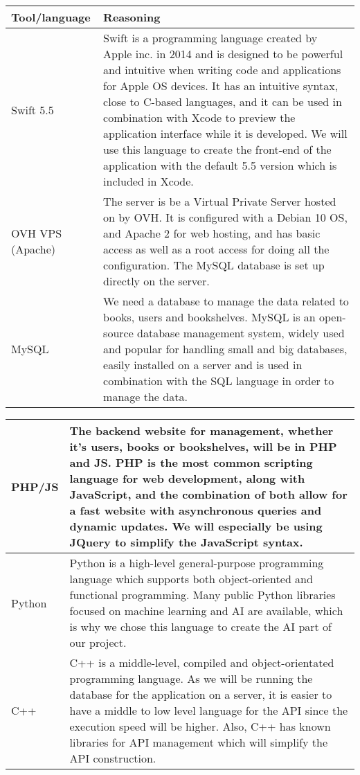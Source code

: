 \documentclass[conference]{IEEEtran}
\begin{document}
\begin{center}
\begin{tabular}{ | m{1.9cm} | m{5.7cm}| } 

\hline
Tool/language & Reasoning \\
 \hline
 Swift 5.5 &  Swift is a programming language created by Apple inc. in 2014 and is designed to be powerful and intuitive when writing code and applications for Apple OS devices. It has an intuitive syntax, close to C-based languages, and it can be used in combination with Xcode to preview the application interface while it is developed. We will use this language to create the front-end of the application with the default 5.5 version which is included in Xcode.\\
  \hline
 OVH VPS (Apache) &  The server is be a Virtual Private Server hosted on by OVH. It is configured with a Debian 10 OS, and Apache 2 for web hosting, and has basic access as well as a root access for doing all the configuration. The MySQL database is set up directly on the server.\\ 
 \hline
 MySQL & We need a database to manage the data related to books, users and bookshelves. MySQL is an open-source database management system, widely used and popular for handling small and big databases, easily installed on a server and is used in combination with the SQL language in order to manage the data.\\
 \hline
 \end{tabular}
 
 \begin{tabular}{ | m{1.9cm} | m{5.7cm}| } 
 \hline
 PHP/JS & The backend website for management, whether it's users, books or bookshelves, will be in PHP and JS. PHP is the most common scripting language for web development, along with JavaScript, and the combination of both allow for a fast website with asynchronous queries and dynamic updates. We will especially be using JQuery to simplify the JavaScript syntax.\\
 \hline
 Python & Python is a high-level general-purpose programming language which supports both object-oriented and functional programming. Many public Python libraries focused on machine learning and AI are available, which is why we chose this language to create the AI part of our project. \\
 \hline
 C++ & C++ is a middle-level, compiled and object-orientated programming language. As we will be running the database for the application on a server, it is easier to have a middle to low level language for the API since the execution speed will be higher. Also, C++ has known libraries for API management which will simplify the API construction.\\
 \hline
 
\end{tabular}
\end{center}
\hfill
\end{document}

